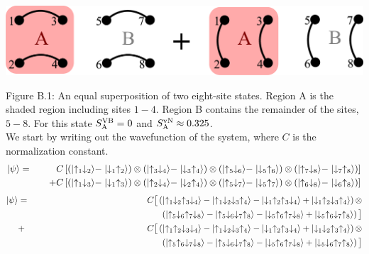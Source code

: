\includegraphics[width=6in]{./figures/made/example2.pdf}

Figure B.1: An equal superposition of two eight-site states.
Region A is the shaded region including sites $1-4$.  
Region B contains the remainder of the sites, $5-8$.
For this state $\VB_{\rm A}=0$ and $\VN_{\rm A}\approx 0.325$.
\\

We start by writing out the wavefunction of the system, where $C$ is the normalization constant.
\begin{eqnarray*}
 \ket{\psi}  &=& C\left[\singlet{1}{2} \ox \singlet{3}{4} \ox \singlet{5}{6} \ox \singlet{7}{8}\right]  \\
	   &     &\;\;\;\;+ C\left[\singlet{1}{3} \ox \singlet{2}{4} \ox \singlet{5}{7} \ox \singlet{6}{8}\right]  \\ 
\end{eqnarray*}
\begin{eqnarray*}
 \ket{\psi}	     &=& C\big[\left(\ket{\up_1\dw_2\up_3\dw_4} - \ket{\up_1\dw_2\dw_3\up_4} -
	              \ket{\dw_1\up_2\up_3\dw_4} + \ket{\dw_1\up_2\dw_3\up_4}\right) \ox \\
	        && \hspace{2in}
	               \left(\ket{\up_5\dw_6\up_7\dw_8} - \ket{\up_5\dw_6\dw_7\up_8} -
	              \ket{\dw_5\up_6\up_7\dw_8} + \ket{\dw_5\up_6\dw_7\up_8}\right)\big]  \\
	     &   +& C\big[\left(\ket{\up_1\up_2\dw_3\dw_4} - \ket{\up_1\dw_2\dw_3\up_4} -
	              \ket{\dw_1\up_2\up_3\dw_4} + \ket{\dw_1\dw_2\up_3\up_4}\right) \ox  \\
	               && \hspace{2in}
	              \left(\ket{\up_5\up_6\dw_7\dw_8} - \ket{\up_5\dw_6\dw_7\up_8} -
	              \ket{\dw_5\up_6\up_7\dw_8} + \ket{\dw_5\dw_6\up_7\up_8}\right)\big] \end{eqnarray*}
